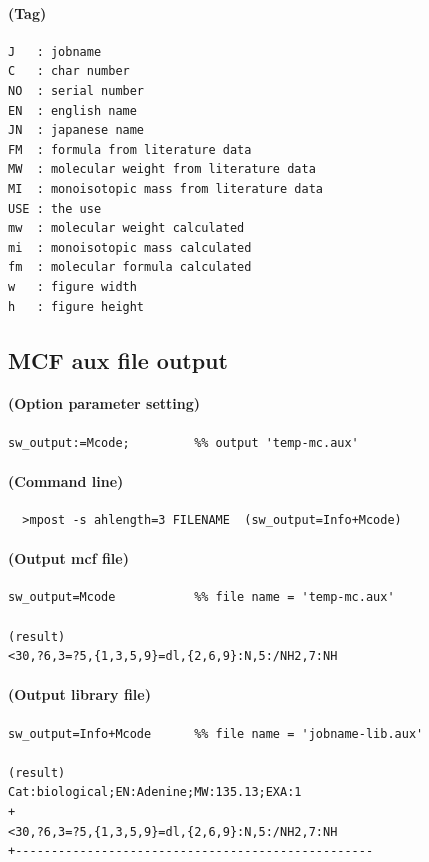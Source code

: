 \documentclass[a4paper]{article}
\begin{document}
\paragraph{(Tag)}
\begin{verbatim}
J   : jobname                           
C   : char number
NO  : serial number
EN  : english name
JN  : japanese name
FM  : formula from literature data
MW  : molecular weight from literature data
MI  : monoisotopic mass from literature data
USE : the use
mw  : molecular weight calculated
mi  : monoisotopic mass calculated
fm  : molecular formula calculated
w   : figure width
h   : figure height
\end{verbatim}
\noindent%
\newpage
\subsection{MCF aux file output}
\paragraph{(Option parameter setting)}
%
%
\begin{verbatim}
sw_output:=Mcode;         %% output 'temp-mc.aux'
\end{verbatim}
\paragraph{(Command line)}
\begin{verbatim}
  >mpost -s ahlength=3 FILENAME  (sw_output=Info+Mcode)
\end{verbatim}
\paragraph{(Output mcf file)}
\begin{verbatim}
sw_output=Mcode           %% file name = 'temp-mc.aux'

(result)
<30,?6,3=?5,{1,3,5,9}=dl,{2,6,9}:N,5:/NH2,7:NH

\end{verbatim}
\paragraph{(Output library file)}
\begin{verbatim}
sw_output=Info+Mcode      %% file name = 'jobname-lib.aux'

(result)
Cat:biological;EN:Adenine;MW:135.13;EXA:1
+
<30,?6,3=?5,{1,3,5,9}=dl,{2,6,9}:N,5:/NH2,7:NH
+--------------------------------------------------

\end{verbatim}
\end{document}
